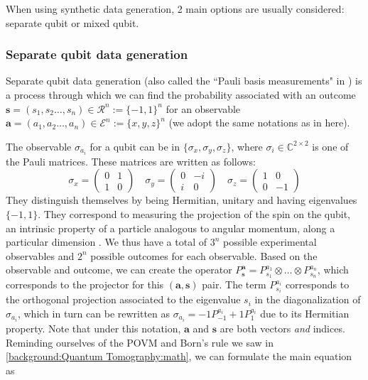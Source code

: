 \documentclass[12pt]{memoir}
\newcommand{\mb}{\mathbf}
\newcommand{\ti}{\textit}
\begin{document}
When using synthetic data generation, 2 main options are usually considered: separate qubit or mixed qubit.


\subsubsection*{Separate qubit data generation}\label{section:sep-qub-dg}
Separate qubit data generation (also called the ``Pauli basis measurements" in \cite{Guta20}) is a process through which we can find the probability associated with an outcome $\mb s = (s_1, s_2 \dots, s_n) \in \mathcal{R}^n := \{-1, 1\}^n $ for an observable $\mb a = (a_1, a_2 \dots, a_n) \in \mathcal{E}^n := \{x,y,z\}^n$ (we adopt the same notations as in \cite{MA17} here).\medbreak

The observable $\sigma_{a_i}$ for a qubit can be in $\{\sigma_x, \sigma_y, \sigma_z\}$, where $\sigma_i \in \mathbb{C}^{2 \times 2}$ is one of the Pauli matrices. These matrices are written as follows:
\begin{equation}
    \sigma_x  = \begin{pmatrix}
        0 & 1\\
        1 & 0
    \end{pmatrix}\quad
    \sigma_y = \begin{pmatrix}
        0 & -i\\
        i & 0
    \end{pmatrix}\quad
    \sigma_z = \begin{pmatrix}
        1 & 0\\
        0 & -1
    \end{pmatrix}
\end{equation}
They distinguish themselves by being Hermitian, unitary and having eigenvalues $\{-1, 1\}$. They correspond to measuring the projection of the spin on the qubit, an intrinsic property of a particle analogous to angular momentum, along a particular dimension \cite{wiki:pauli-matrices}.
We thus have a total of $3^n$ possible experimental observables and $2^n$ possible outcomes for each observable. Based on the observable and outcome, we can create the operator $P^\mb a_{\mb s} = P^{a_1}_{s_1} \otimes \dots \otimes P^{a_n}_{s_n}$, which corresponds to the projector for this $(\mb a,\mb s)$ pair. The term $P^{a_i}_{s_i}$ corresponds to the orthogonal projection associated to the eigenvalue $s_i$ in the diagonalization of $\sigma_{a_i}$, which in turn can be rewritten as $\sigma_{a_i} = -1P^{a_i}_{-1} + 1P^{a_i}_1$ due to its Hermitian property. Note that under this notation, $\mb a$ and $\mb s$ are both vectors \ti{and} indices. Reminding ourselves of the POVM and Born's rule we saw in \ref{background:Quantum Tomography:math}, we can formulate the main equation as
\end{document}
